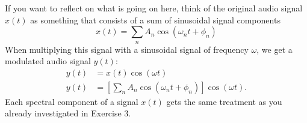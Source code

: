 \begin{enumerate}
\begin{itemize}
        \end{itemize}
        If you want to reflect on what is going on here, think of the original
        audio signal $x(t)$ as something that consists of a sum of sinusoidal
        signal components
        \begin{equation}
          x(t) = \sum_{n} A_n \cos(\omega_n t + \phi_n)
        \end{equation}
        When multiplying this signal with a sinusoidal signal of frequency $\omega$, we get a modulated audio signal $y(t)$:
        \begin{align}
          y(t) & = x(t) \cos(\omega t)                                                 \\
          y(t) & = \left[\sum_{n} A_n \cos(\omega_n t + \phi_n)\right] \cos(\omega t).
        \end{align}
        Each spectral component of a signal $x(t)$ gets the same treatment as you already investigated in Exercise 3.

\end{enumerate}